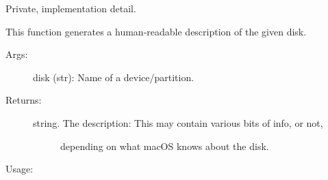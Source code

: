 \documentclass[letterpaper,10pt,english]{sphinxmanual}
\begin{document}
\begin{fulllineitems}
\label{\detokenize{macos:getdevinfo.macos.get_description}}
Private, implementation detail.

This function generates a human-readable description of the given disk.
\begin{description}
\item[{Args:}] \leavevmode
disk (str):   Name of a device/partition.

\item[{Returns:}] \leavevmode\begin{description}
\item[{string. The description: This may contain various bits of info, or not,}] \leavevmode
depending on what macOS knows about the disk.

\end{description}

\end{description}

Usage:

\begin{sphinxVerbatim}[commandchars=\\\{\}]
  
\end{sphinxVerbatim}

\end{fulllineitems}

\end{document}
